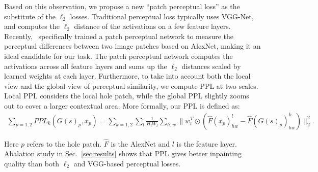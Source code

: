 Based on this observation, we propose a new ``patch perceptual loss'' as the substitute of the $\ell_2$ losses. Traditional perceptual loss typically uses VGG-Net, and computes the $\ell_2$ distance of the activations on a few feature layers. Recently,~\cite{zhang2016stackgan} specifically trained a patch perceptual network to measure the perceptual differences between two image patches based on AlexNet, making it an ideal candidate for our task. The patch perceptual network computes the activations across all feature layers and sums up the $\ell_2$ distances scaled by learned weights at each layer. Furthermore, to take into account both the local view and the global view of perceptual similarity, we compute PPL at two scales. Local PPL considers the local hole patch, while the global PPL slightly zooms out to cover a larger contextual area. More formally, our PPL is defined as:
\begin{eqnarray}
\sum\limits_{p=1,2}PPL_k(G(s)_p, x_p) = \sum\limits_{k=1,2}\sum\limits_l\frac{1}{H_lW_l}\sum\limits_{h,w}\parallel w_l^T\odot(\hat{F}(x_p)^l_{hw}-\hat{F}(G(s)_p)^k_{hw})\parallel^2_2.
\end{eqnarray}

Here $p$ refers to the hole patch. $\hat{F}$ is the AlexNet and $l$ is the feature layer. Abalation study in Sec.~\ref{sec:results} shows that PPL gives better inpainting quality than both $\ell_2$ and VGG-based perceptual losses. 

